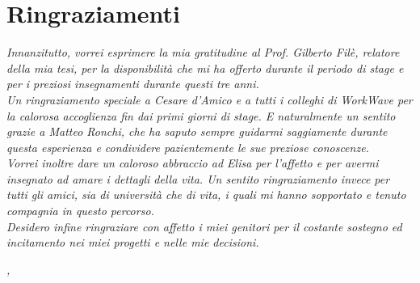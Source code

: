 
\cleardoublepage
{}
{}


\bigskip

\begingroup
\let\clearpage\relax
\let\cleardoublepage\relax
\let\cleardoublepage\relax

\chapter*{Ringraziamenti}

\noindent \textit{Innanzitutto, vorrei esprimere la mia gratitudine al Prof. Gilberto Filè, relatore della mia tesi, per la disponibilità che mi ha offerto durante il periodo di stage e per i preziosi insegnamenti durante questi tre anni.}\\

\noindent \textit{Un ringraziamento speciale a Cesare d'Amico e a tutti i colleghi di WorkWave per la calorosa accoglienza fin dai primi giorni di stage. E naturalmente un sentito grazie a Matteo Ronchi, che ha saputo sempre guidarmi saggiamente durante questa esperienza e condividere pazientemente le sue preziose conoscenze.}\\

\noindent \textit{Vorrei inoltre dare un caloroso abbraccio ad Elisa per l'affetto e per avermi insegnato ad amare i dettagli della vita. Un sentito ringraziamento invece per tutti gli amici, sia di università che di vita, i quali mi hanno sopportato e tenuto compagnia in questo percorso.}\\

\noindent \textit{Desidero infine ringraziare con affetto i miei genitori per il costante sostegno ed incitamento nei miei progetti e nelle mie decisioni.}\\

\bigskip

\noindent\textit{\myLocation, \myTime}
\hfill \myName

\endgroup

